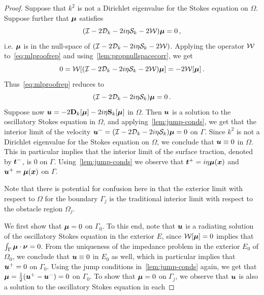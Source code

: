 \begin{proof}
  Suppose that $k^2$ is not a Dirichlet eigenvalue for the
  Stokes equation on $\Omega$. Suppose further that ${\boldsymbol \mu}$ satisfies
  \begin{equation}
    (\mathcal I - 2{\mathcal D}_{k} -2i\eta{\mathcal S}_{k} - 2{\mathcal W}) {\boldsymbol \mu} = 0 \, ,
    \label{eq:mlproofrep}
  \end{equation}
i.e. ${\boldsymbol \mu}$ is in the null-space
of $(\mathcal I - 2 {\mathcal D}_{k} - 2i\eta {\mathcal S}_{k} - 2 {\mathcal W})$. 
Applying the operator ${\mathcal W}$ to~\cref{eq:mlproofrep} and 
using~\cref{lem:propnullspacecorr}, we get
\begin{equation}
0 = {\mathcal W} [(\mathcal I - 2{\mathcal D}_{k} - 2i\eta{\mathcal S}_{k} - 2{\mathcal W}){\boldsymbol \mu}] = -2{\mathcal W} [{\boldsymbol \mu}] \, .
\end{equation}
Thus~\cref{eq:mlproofrep} reduces to
\begin{equation}
(\mathcal I - 2 {\mathcal D}_{k} - 2i\eta {\mathcal S}_{k}){\boldsymbol \mu} = 0\, .
\end{equation}
Suppose now ${\boldsymbol u} = -2{\bf D}_{k}[{\boldsymbol \mu}] -2i\eta{\bf S}_{k}[{\boldsymbol \mu}]$
in $\Omega$. Then ${\boldsymbol u}$ is a solution to the oscillatory
Stokes equation in $\Omega$, and applying~\cref{lem:jump-conds},
we get that the interior limit of the velocity
${\boldsymbol u}^{-} = (\mathcal I - 2{\mathcal D}_{k} -2i\eta{\mathcal S}_{k}) {\boldsymbol \mu} = 0$ on $\Gamma$.
Since $k^2$ is not a Dirichlet eigenvalue for the Stokes equation
on $\Omega$, we conclude that ${\boldsymbol u} \equiv 0$ in $\Omega$. 
This in particular implies that the interior limit of the
surface traction, denoted by ${\boldsymbol t}^{-}$, is $0$ on $\Gamma$.
Using~\cref{lem:jump-conds} we observe that ${\boldsymbol t}^{+}
= i\eta {\boldsymbol \mu}({\boldsymbol x})$ and ${\boldsymbol u}^{+} = {\boldsymbol \mu}({\boldsymbol x})$ on $\Gamma$.
\begin{remark}
  Note that there is potential for confusion here
  in that the exterior limit with respect to $\Omega$ 
  for the boundary $\Gamma_{j}$ is the traditional interior 
  limit with respect to the obstacle region $\Omega_{j}$.
\end{remark}
We first show that ${\boldsymbol \mu}=0$ on $\Gamma_{0}$. 
To this end, note that ${\boldsymbol u}$ is a radiating solution
of the oscillatory Stokes equation in the exterior $E$,
since ${\mathcal W}[{\boldsymbol \mu}] = 0$ implies that $\int_{\Gamma} {\boldsymbol \mu}
\cdot {\boldsymbol \nu} = 0$. From the uniqueness of the impedance problem
in the exterior $E_0$ of $\Omega_0$, we conclude that
${\boldsymbol u} \equiv 0$ in $E_0$ as well, which in particular
implies that ${\boldsymbol u}^{+}=0$ on $\Gamma_{0}$.   
Using the jump conditions in~\cref{lem:jump-conds}
again, we get that
${\boldsymbol \mu} = \frac{1}{2}({\boldsymbol u}^{+} - {\boldsymbol u}^{-}) = 0$ on
$\Gamma_{0}$. To show that ${\boldsymbol \mu}=0$ on
$\Gamma_{j}$, we observe that ${\boldsymbol u}$ is also a
solution to the oscillatory Stokes equation in each

\end{proof}
